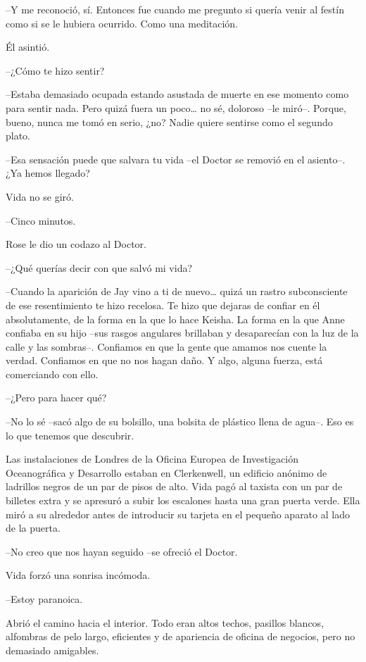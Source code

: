 {--Y me reconoció, sí. Entonces fue cuando me pregunto si quería venir
al festín como si se le hubiera ocurrido. Como una meditación.}

{Él asintió.}

{--¿Cómo te hizo sentir?}

{--Estaba demasiado ocupada estando asustada de muerte en ese momento
 como para sentir nada. Pero quizá fuera un poco\ldots{} no sé, doloroso
 --le miró--. Porque, bueno, nunca me tomó en serio, ¿no? Nadie quiere
sentirse como el segundo plato.}

{--Esa sensación puede que salvara tu vida --el Doctor se removió en el
asiento--. ¿Ya hemos llegado?}

{Vida no se giró.}

{--Cinco minutos.}

{Rose le dio un codazo al Doctor.}

{--¿Qué querías decir con que salvó mi vida?}

{--Cuando la aparición de Jay vino a ti de nuevo\ldots{} quizá un rastro
 subconsciente de ese resentimiento te hizo recelosa. Te hizo que dejaras
 de confiar en él absolutamente, de la forma en la que lo hace Keisha. La
 forma en la que Anne confiaba en su hijo --sus rasgos angulares
 brillaban y desaparecían con la luz de la calle y las sombras--.
 Confiamos en que la gente que amamos nos cuente la verdad. Confiamos en
 que no nos hagan daño. Y algo, alguna fuerza, está comerciando con
ello.}

{--¿Pero para hacer qué?}

{--No lo sé --sacó algo de su bolsillo, una bolsita de plástico llena de
agua--. Eso es lo que tenemos que descubrir.}

{Las instalaciones de Londres de la Oficina Europea de Investigación
 Oceanográfica y Desarrollo estaban en Clerkenwell, un edificio anónimo
 de ladrillos negros de un par de pisos de alto. Vida pagó al taxista con
 un par de billetes extra y se apresuró a subir los escalones hasta una
 gran puerta verde. Ella miró a su alrededor antes de introducir su
tarjeta en el pequeño aparato al lado de la puerta.}

{--No creo que nos hayan seguido --se ofreció el Doctor.}

{Vida forzó una sonrisa incómoda.}

{--Estoy paranoica.}

{Abrió el camino hacia el interior. Todo eran altos techos, pasillos
 blancos, alfombras de pelo largo, eficientes y de apariencia de oficina
de negocios, pero no demasiado amigables.}

